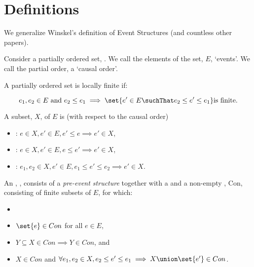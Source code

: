 



\section*{Definitions}

We generalize Winskel's definition of Event Structures
\cite{winskel1980phdThEvents, winskel1986eventStruct, winskelNielsen1995concurrency,
rideauWinskel2011concurrentStrategies} (and countless other papers).


\begin{definition}
Consider a partially ordered set, . We call the elements of the set, $E$, `events'.
We call the partial order, a `causal order'.

A partially ordered set is locally finite if:

 $$e_1, e_2 \in E \text{ and } e_2 \leq e_1 \implies \set{e' \in E \suchThat e_2 \leq
   e' \leq e_1} \text{is finite}.$$

A subset, $X$, of $E$ is (with respect to the causal order)
\begin{itemize}
  \item {} : $e \in X, e' \in E, e' \leq e
    \implies e' \in X$,
  \item {} : $e \in X, e' \in E, e \leq e'
    \implies e' \in X$,
  \item {} : $e_1, e_2 \in X, e' \in E, e_1 \leq e' \leq e_2
    \implies e' \in X$.
\end{itemize}

An , , consists of a
\emph{pre-event structure} together with a and a non-empty
, Con, consisting of finite subsets of
$E$, for which:

\begin{itemize}
  \item 
  \item $\set{e} \in Con$ for all $e \in E$,
  \item $Y \subseteq X \in Con \implies Y \in Con$, and
    \item $X \in Con$ and $\forall e_1, e_2 \in X, e_2 \leq e' \leq e_1 \implies X
  \union \set{e'} \in Con$.
\end{itemize}
\end{definition}

